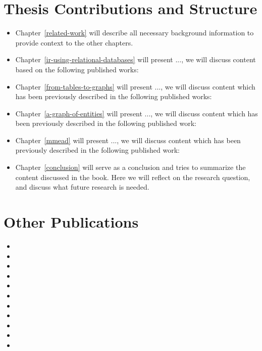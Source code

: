 \section{Thesis Contributions and Structure}

\begin{itemize}
\item Chapter~\ref{related-work} will describe all necessary background information to provide context to the other chapters. 

\item Chapter~\ref{ir-using-relational-databases} will present ..., we will discuss content based on the following published works: \citep{Kamphuis2020BM25, olddog-docker}

\item Chapter~\ref{from-tables-to-graphs} will present ..., we will discuss content which has been previously described in the following published works: \citep{need-graph-db, geesedb}

\item Chapter~\ref{a-graph-of-entities} will present ..., we will discuss content which has been previously described in the following published work: \citep{rebl}

\item Chapter~\ref{mmead} will present ..., we will discuss content which has been previously described in the following published work: \citep{mmead}

\item Chapter~\ref{conclusion} will serve as a conclusion and tries to summarize the content discussed in the book. Here we will reflect on the research question, and discuss what future research is needed.
\end{itemize}

\section{Other Publications}

{\scriptsize
	\begin{itemize}	
		\item {}
		\item {}
		\item {}
		\item {}	
		\item {}
		\item {}
		\item {}
		\item {}
		\item {}
		\item {}
		\item {}
	\end{itemize}
}
